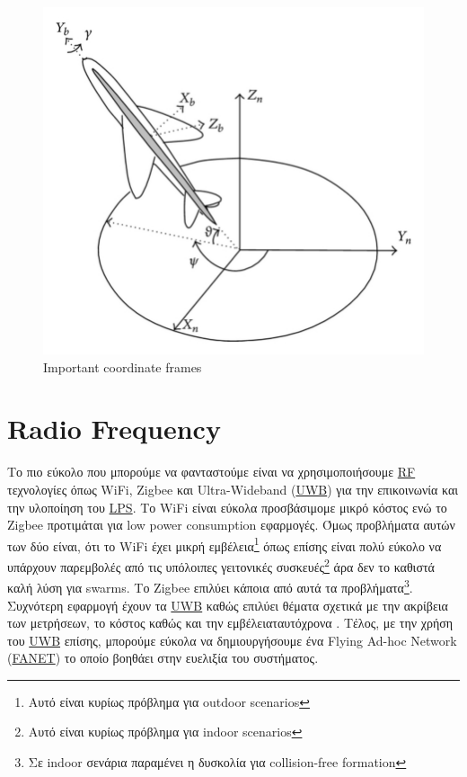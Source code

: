 \begin{figure} [H]
	\centering
	\includegraphics[width=0.6\linewidth]{Images/Related-Work/b-frame-n-frame-and-Euler-angles.png}
	\decoRule
	\caption[Important coordinate frames]{Important coordinate frames \cite{body-frames}}
	\label{fig:Important-coordinate-frames}
\end{figure}


\section{Radio Frequency}
Το πιο εύκολο που μπορούμε να φανταστούμε είναι να χρησιμοποιήσουμε \hyperref[abbr:RF]{RF} τε\-χνο\-λο\-γίες
όπως WiFi, Zigbee και Ultra-Wideband (\hyperref[abbr:UWB]{UWB}) για την επικοινωνία και την υλοποίηση του \hyperref[abbr:LPS]{LPS}.   
Το WiFi είναι εύκολα προσβάσιμο\udot με μικρό κόστος ενώ το Zigbee προτιμάται για
low power consumption εφαρμογές. Όμως προβλήματα αυτών των δύο είναι, ότι το 
WiFi έχει μικρή εμβέλεια\footnote{Αυτό είναι κυρίως πρόβλημα για outdoor scenarios} όπως επίσης είναι πολύ εύκολο 
να υπάρχουν παρεμβολές από τις υπόλοιπες γειτονικές συσκευές\footnote{Αυτό είναι κυρίως πρόβλημα για indoor scenarios} 
άρα δεν το καθιστά καλή λύση για swarms. Το Zigbee επιλύει κάποια από αυτά τα 
προβλήματα\footnote{Σε indoor σενάρια παραμένει η δυσκολία για collision-free formation}. Συχνότερη εφαρμογή έχουν 
τα \hyperref[abbr:UWB]{UWB} καθώς επιλύει θέματα σχετικά με την ακρίβεια των μετρήσεων, το κόστος καθώς και την 
εμβέλεια\udot ταυτόχρονα \cite{uwb-imu-gps3}. Τέλος, με την χρήση του \hyperref[abbr:UWB]{UWB} επίσης, μπορούμε εύκολα να δημιουργήσουμε
ένα Flying Ad-hoc Network (\hyperref[abbr:FANET]{FANET}) το οποίο βοηθάει στην ευελιξία του συστήματος.


